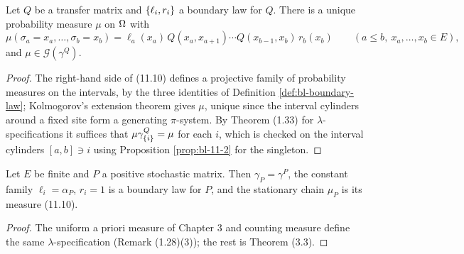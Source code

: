 \begin{theorem}[Georgii (11.9)(a)]
    \label{thm:bl-11-9a}
    \leanok

    Let $Q$ be a transfer matrix and $\left\{ \ell_i, r_i \right\}$ a boundary law for $Q$. There is a unique
    probability measure $\mu$ on $\Omega$ with
    \[
        \mu(\sigma_a = x_a, \dots, \sigma_b = x_b)
        = \ell_a(x_a)\, Q(x_a, x_{a+1}) \cdots Q(x_{b-1}, x_b)\, r_b(x_b)
        \qquad (a \leq b,\ x_a, \dots, x_b \in E), \tag{11.10}
    \]
    and $\mu \in \mathcal G(\gamma^Q)$.
\end{theorem}
\begin{proof}
    \leanok
    The right-hand side of (11.10) defines a projective family of probability measures on the
    intervals, by the three identities of Definition \ref{def:bl-boundary-law}; Kolmogorov's
    extension theorem gives $\mu$, unique since the interval cylinders around a fixed site form a
    generating $\pi$-system. By Theorem (1.33) for $\lambda$-specifications it suffices that
    $\mu \gamma^Q_{\left\{ i \right\}} = \mu$ for each $i$, which is checked on the interval cylinders
    $[a,b] \ni i$ using Proposition \ref{prop:bl-11-2} for the singleton.
\end{proof}

\begin{proposition}
    \label{prop:bl-finite-state}
    \leanok

    Let $E$ be finite and $P$ a positive stochastic matrix. Then $\gamma_P = \gamma^P$, the
    constant family $\ell_i = \alpha_P$, $r_i = 1$ is a boundary law for $P$, and the stationary
    chain $\mu_P$ is its measure (11.10).
\end{proposition}
\begin{proof}
    \leanok
    The uniform a priori measure of Chapter 3 and counting measure define the same
    $\lambda$-specification (Remark (1.28)(3)); the rest is Theorem (3.3).
\end{proof}

